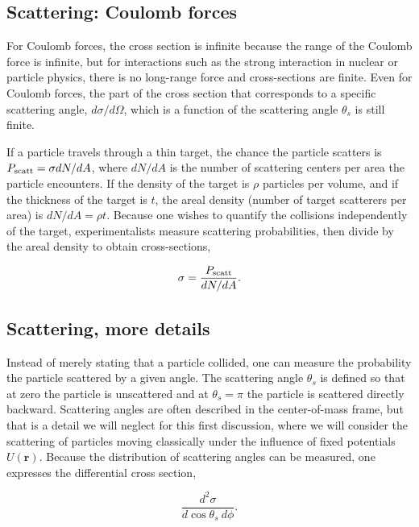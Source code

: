 \documentclass[%
oneside,                 %
final,                   %
10pt]{article}
\begin{document}
\subsection{Scattering: Coulomb forces}

For Coulomb forces, the cross section is infinite because the range of
the Coulomb force is infinite, but for interactions such as the strong
interaction in nuclear or particle physics, there is no long-range
force and cross-sections are finite. Even for Coulomb forces, the part
of the cross section that corresponds to a specific scattering angle,
$d\sigma/d\Omega$, which is a function of the scattering angle
$\theta_s$ is still finite.

If a particle travels through a thin target, the chance the particle
scatters is $P_{\rm scatt}=\sigma dN/dA$, where $dN/dA$ is the number
of scattering centers per area the particle encounters. If the density
of the target is $\rho$ particles per volume, and if the thickness of
the target is $t$, the areal density (number of target scatterers per
area) is $dN/dA=\rho t$. Because one wishes to quantify the collisions
independently of the target, experimentalists measure scattering
probabilities, then divide by the areal density to obtain
cross-sections,

\begin{eqnarray}
\sigma=\frac{P_{\rm scatt}}{dN/dA}.
\end{eqnarray}

\subsection{Scattering, more details}

Instead of merely stating that a particle collided, one can measure
the probability the particle scattered by a given angle. The
scattering angle $\theta_s$ is defined so that at zero the particle is
unscattered and at $\theta_s=\pi$ the particle is scattered directly
backward. Scattering angles are often described in the center-of-mass
frame, but that is a detail we will neglect for this first discussion,
where we will consider the scattering of particles moving classically
under the influence of fixed potentials $U(\bm{r})$. Because the
distribution of scattering angles can be measured, one expresses the
differential cross section,

\begin{equation}
\frac{d^2\sigma}{d\cos\theta_s~d\phi}.
\end{equation}
\end{document}
